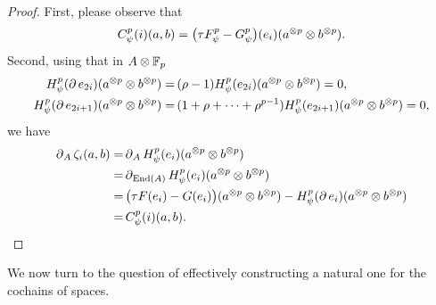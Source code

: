 \begin{proof}
	First, please observe that
	\[
	C^p_\psi(i)(a,b) =
	\big(\tau F_\psi^p - G_\psi^p\big)(e_i)(a^{\otimes p} \otimes b^{\otimes p}).
	\]
	Second, using that in $A \otimes {\mathbb{F}_p}$
	\begin{align*}
		H_\psi^p(\operatorname{\partial} e_{2i})(a^{\otimes p} \otimes b^{\otimes p}) =&\,
		(\rho - 1) H_\psi^p(e_{2i})(a^{\otimes p} \otimes b^{\otimes p}) = 0, \\
		H_\psi^p(\operatorname{\partial} e_{2i+1})(a^{\otimes p} \otimes b^{\otimes p}) =&\,
		(1+\rho+\dots+\rho^{p-1}) H_\psi^p(e_{2i+1})(a^{\otimes p} \otimes b^{\otimes p}) = 0,
	\end{align*}
	we have
	\begin{align*}
		\operatorname{\partial}_A \zeta_i(a,b) =&
		\operatorname{\partial}_A H_\psi^p(e_i)(a^{\otimes p} \otimes b^{\otimes p}) \\ =&
		\operatorname{\partial}_{\mathrm{End}(A)} H_\psi^p(e_i)(a^{\otimes p} \otimes b^{\otimes p}) \\ =& \,
		\big(\tau F(e_i) - G(e_i)\big)(a^{\otimes p} \otimes b^{\otimes p}) -
		H_\psi^p(\operatorname{\partial} e_i)(a^{\otimes p} \otimes b^{\otimes p}) \\ =&\,
		C^p_\psi(i)(a,b).\qedhere
	\end{align*}
\end{proof}

We now turn to the question of effectively constructing a natural one for the cochains of spaces.